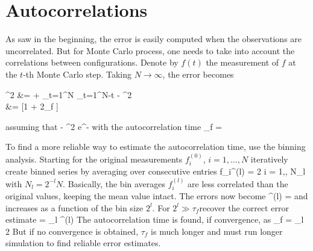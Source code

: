 	\section{Autocorrelations}

		As saw in the beginning, the error is easily computed when the observations are uncorrelated. But for Monte Carlo process, one needs to take into account the correlations between configurations. Denote by $f(t)$ the measurement of $f$ at the $t$-th Monte Carlo step. Taking $N \to \infty$, the error becomes
		\be \begin{split} \Delta^2 &=  +  \sum_{t=1}^N \sum_{\delta t=1}^{N-t}  - ^2 \\ &=  [1 + 2\tau_f ] \end{split} \ee
		assuming that
		\be {} - ^2 \propto e^{-} \ee
		with the autocorrelation time
		\be \tau_f =  \ee

		To find a more reliable way to estimate the autocorrelation time, use the binning analysis. Starting for the original measurements $f_i^{(0)}$, $i=1,\dotsc,N$ iteratively create binned series by averaging over consecutive entries
		\be f_i^{(l)} =  2 \left[f_{2i-1}^{(l-1)} + f_{2i}^{(l-1)} \right]  i = 1,\dotsc, N_l \ee
		with $N_l = 2^{-l}N$. Basically, the bin averages $f_i^{(l)}$ are less correlated than the original values, keeping the mean value intact. The errors now become
		\be \Delta^{(l)} =  \ee
		and increases as a function of the bin size $2^l$. For $2^l \gg \tau_f$recover the correct error estimate
		\be \Delta = \lim_{l\to \infty} \Delta^{(l)} \ee
		The autocorrelation time is found, if convergence, as
		\be \tau_f = \lim_{l\to \infty}  2  \ee
		But if no convergence is obtained, $\tau_f$ is much longer and must run longer simulation to find reliable error estimates.

